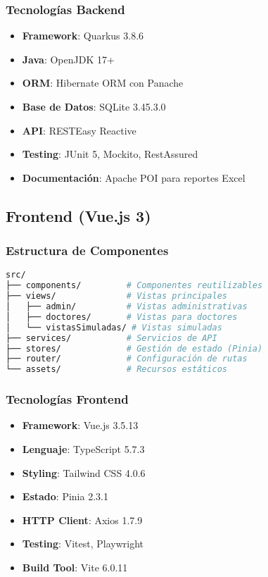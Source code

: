 \documentclass[12pt,a4paper]{article}
\begin{document}
\subsubsection{Tecnologías Backend}
\begin{itemize}
    \item \textbf{Framework}: Quarkus 3.8.6
    \item \textbf{Java}: OpenJDK 17+
    \item \textbf{ORM}: Hibernate ORM con Panache
    \item \textbf{Base de Datos}: SQLite 3.45.3.0
    \item \textbf{API}: RESTEasy Reactive
    \item \textbf{Testing}: JUnit 5, Mockito, RestAssured
    \item \textbf{Documentación}: Apache POI para reportes Excel
\end{itemize}

\subsection{Frontend (Vue.js 3)}

\subsubsection{Estructura de Componentes}
\begin{lstlisting}[language=bash]
src/
├── components/         # Componentes reutilizables
├── views/              # Vistas principales
│   ├── admin/          # Vistas administrativas
│   ├── doctores/       # Vistas para doctores
│   └── vistasSimuladas/ # Vistas simuladas
├── services/           # Servicios de API
├── stores/             # Gestión de estado (Pinia)
├── router/             # Configuración de rutas
└── assets/             # Recursos estáticos
\end{lstlisting}

\subsubsection{Tecnologías Frontend}
\begin{itemize}
    \item \textbf{Framework}: Vue.js 3.5.13
    \item \textbf{Lenguaje}: TypeScript 5.7.3
    \item \textbf{Styling}: Tailwind CSS 4.0.6
    \item \textbf{Estado}: Pinia 2.3.1
    \item \textbf{HTTP Client}: Axios 1.7.9
    \item \textbf{Testing}: Vitest, Playwright
    \item \textbf{Build Tool}: Vite 6.0.11
\end{itemize}
\end{document}
